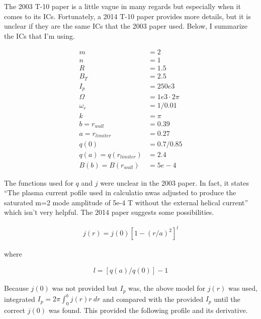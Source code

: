 \documentclass{article}
\begin{document}
The 2003 T-10 paper is a little vague in many regards but especially when it comes to its ICs.  Fortunately, a 2014 T-10 paper provides more details, but it is unclear if they are the same ICs that the 2003 paper used.  Below, I summarize the ICs that I'm using. 

\begin{equation} \label{ICConstants}
\begin{split}
m &= 2 \\
n &= 1 \\
R &= 1.5 \\
B_T &= 2.5 \\
I_p &= 250e3 \\
\Omega & =1e3 \cdot 2 \pi \\
\omega_r & = 1/0.01 \\
k &= \pi \\
b = r_{wall} & = 0.39 \\
a = r_{limiter} & = 0.27 \\
q(0) &= 0.7/0.85 \\
q(a) = q(r_{limiter}) &= 2.4 \\
B(b) = B(r_{wall}) & = 5e-4
\end{split} 
\end{equation} 

The functions used for $q$ and $j$ were unclear in the 2003 paper.  In fact, it states ``The plasma current pofile used in calculatio nwas adjusted to produce the saturated m=2 mode amplitude of 5e-4 T without the external helical current'' which isn't very helpful.  The 2014 paper suggests some possibilities.  

\begin{equation} \label{wessonCurrentProfile}
\begin{split}
j(r)=j(0) \left[ 1-(r/a)^2 \right]^l
\end{split} 
\end{equation} 

\noindent where 

\begin{equation} \label{j}
\begin{split}
l=\left[ q(a)/q(0)\right]-1
\end{split} 
\end{equation} 

Because $j(0)$ was not provided but $I_p$ was, the above model for $j(r)$ was used, integrated $I_p = 2\pi \int_0^b j(r)r \ dr$ and compared with the provided $I_p$ until the correct $j(0)$ was found.  This provided the following profile and its derivative.
\end{document}
